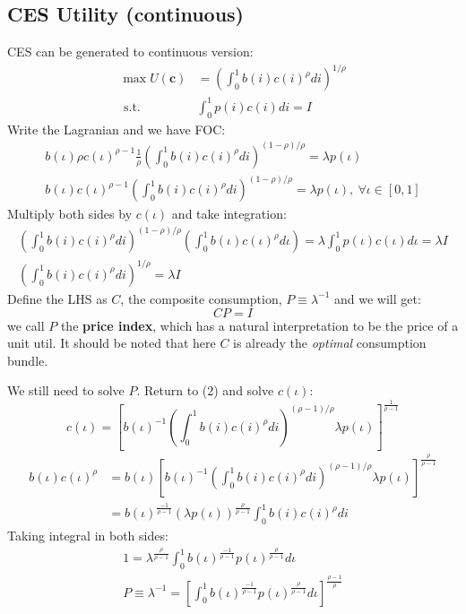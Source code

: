\documentclass{book}
\theoremstyle{plain}
\theoremstyle{definition}
\begin{document}
\subsection{CES Utility (continuous)} %
\label{sub:ces_utility_}

CES can be generated to continuous version:
\[\begin{aligned} \max U ( \mathbf { c } ) & = \left( \int _ { 0 } ^ { 1 } b ( i ) c ( i ) ^ { \rho } d i \right) ^ { 1 / \rho } \\ \text { s.t. } & \int _ { 0 } ^ { 1 } p ( i ) c ( i ) d i = I \end{aligned}\]
Write the Lagranian and we have FOC:
\begin{align*}
	b(\iota)\rho c(\iota)^{\rho-1} \frac{1}{\rho} \left( \int _ { 0 } ^ { 1 } b ( i ) c ( i ) ^ { \rho } d i \right) ^ { (1-\rho) / \rho }
	= \lambda p(\iota) \\
	b(\iota)c(\iota)^{\rho-1} \left( \int _ { 0 } ^ { 1 } b ( i ) c ( i ) ^ { \rho } d i \right) ^ { (1 - \rho )/ \rho } 
	= \lambda p(\iota),\ \forall \iota \in [0,1] \tag{2}
\end{align*}
Multiply both sides by $c(\iota)$ and take integration:
\begin{align*}
	\left( \int _ { 0 } ^ { 1 } b ( i ) c ( i ) ^ { \rho } d i \right) ^ { ( 1 - \rho ) / \rho }
	\left( \int _ { 0 } ^ { 1 } b ( \iota ) c ( \iota ) ^ { \rho } d \iota \right) 
	= \lambda \int _ { 0 } ^ { 1 } p ( \iota ) c ( \iota ) d \iota = \lambda I\\
	\left( \int _ { 0 } ^ { 1 } b ( i ) c ( i ) ^ { \rho } d i \right) ^ { 1 / \rho } = \lambda I
\end{align*}
Define the LHS as $C$, the composite consumption, $P\equiv\lambda^{-1}$ and we will get:
\[CP = I\]
we call $P$ the \textbf{price index}, which has a natural interpretation to be the price of a unit util. 
It should be noted that here $C$ is already the \textit{optimal} consumption bundle. 

We still need to solve $P$. Return to (2) and solve $c(\iota)$:
\[
c(\iota) = 
\left[b(\iota)^{-1} \left( \int _ { 0 } ^ { 1 } b ( i ) c ( i ) ^ { \rho } d i \right) ^ { ( \rho -1) / \rho } \lambda p(\iota)
\right]^{\frac{1}{\rho-1}}
\]
\begin{align*}
	b(\iota)c(\iota)^{\rho} &= 
b(\iota)\left[b(\iota)^{-1} \left( \int _ { 0 } ^ { 1 } b ( i ) c ( i ) ^ { \rho } d i \right) ^ { ( \rho -1) / \rho } \lambda p(\iota)
\right]^{\frac{\rho}{\rho-1}}\\
&= b(\iota)^{\frac{-1}{\rho-1}}\left(\lambda p(\iota)\right)^{\frac{\rho}{\rho-1}} \int _ { 0 } ^ { 1 } b ( i ) c ( i ) ^ { \rho } d i
\end{align*}
Taking integral in both sides:
\begin{align*}
	1 = 
	\lambda^{\frac{\rho}{\rho-1}}
	\int_0^1 b(\iota)^{\frac{-1}{\rho-1}} p(\iota)^{\frac{\rho}{\rho-1}} d \iota\\
	P \equiv \lambda^{-1} = \left[\int_0^1 b(\iota)^{\frac{-1}{\rho-1}} p(\iota)^{\frac{\rho}{\rho-1}} d \iota\right]^{\frac{\rho-1}{\rho}}
\end{align*}
\end{document}

